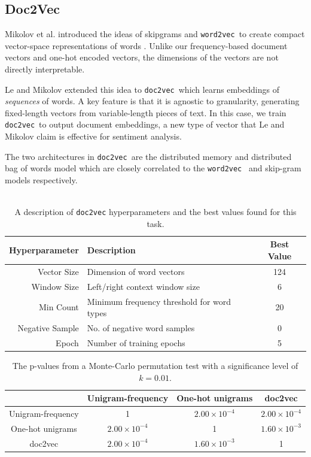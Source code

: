 \documentclass[12pt]{article}
\newcommand{\docvec}{\texttt{doc2vec}}
\newcommand{\wordvec}{\texttt{word2vec}}
\begin{document}
\begin{multicols}{2}
\subsection{Doc2Vec}

Mikolov et al. introduced the ideas of skipgrams and \wordvec~to create compact vector-space representations of words \cite{mikolov2013distributed}. Unlike our frequency-based document vectors and one-hot encoded vectors, the dimensions of the vectors are not directly interpretable.

Le and Mikolov extended this idea to \docvec~which learns embeddings of \emph{sequences} of words. A key feature is that it is agnostic to granularity, generating fixed-length vectors from variable-length pieces of text. In this case, we train \docvec~to output document embeddings, a new type of vector that Le and Mikolov claim is effective for sentiment analysis.

The two architectures in \docvec~are the distributed memory and distributed bag of words model which are closely correlated to the \wordvec~ and skip-gram models respectively.
\\\\
\begin{table}[t]
\centering
 \begin{tabular}{ r l c}
 \bf{Hyperparameter} & \bf{Description} & \bf{Best Value} \\ [0.5ex] 
 \hline
Vector Size &  Dimension of word vectors & 124 \\ 
Window Size & Left/right context window size & 6 \\
Min Count & Minimum frequency threshold for word types & 20 \\
Negative Sample & No. of negative word samples & 0 \\
Epoch & Number of training epochs & 5 \\
\end{tabular}
\caption{A description of \texttt{doc2vec} hyperparameters and the best values found for this task.} \label{table:params}
\end{table}

\begin{table}[t]
\centering
 \begin{tabular}{|c|c|c|c|} 
 \hline
  & Unigram-frequency & One-hot unigrams & doc2vec \\ [0.5ex] 
 \hline\hline
Unigram-frequency & 1 &  $2.00\times 10^{-4}$ & $2.00\times 10^{-4}$\\
 \hline
One-hot unigrams & $2.00\times 10^{-4}$ & 1  & $1.60\times 10^{-3}$\\
 \hline
doc2vec & $2.00\times 10^{-4}$ & $1.60\times 10^{-3}$ & 1 \\
 \hline
\end{tabular}
\caption{The p-values from a Monte-Carlo permutation test with a significance level of $k = 0.01$.} \label{table:p-values}
\end{table}


\end{multicols}
\end{document}
